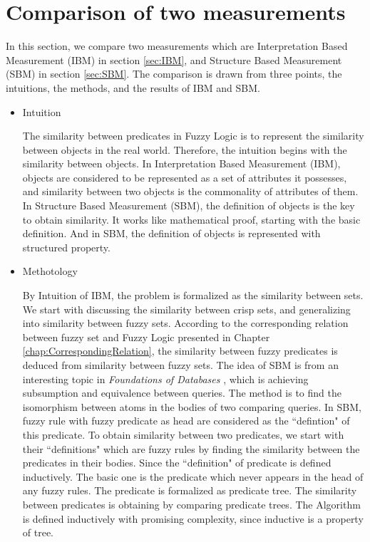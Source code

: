 \section{Comparison of two measurements}
\label{sec:CompTwoMeasurements}
In this section, we compare two measurements which are Interpretation Based Measurement (IBM) in section \ref{sec:IBM}, and  Structure Based Measurement (SBM) in section \ref{sec:SBM}. The comparison is drawn from three points, the intuitions, the methods, and the results of IBM and SBM.

\begin{itemize}
\item Intuition 

The similarity between predicates in Fuzzy Logic is to represent the similarity between objects in the real world. Therefore, the intuition begins with  the similarity between objects. In Interpretation Based Measurement (IBM), objects are considered to be represented as a set of attributes it possesses, and similarity between two objects is the commonality of attributes of them. In Structure Based Measurement (SBM), the definition of objects is the key to obtain similarity. It works like mathematical proof, starting with the basic definition. And in SBM, the definition of objects  is represented with structured property.

\item Methotology

By Intuition of IBM, the problem is formalized as the similarity between sets. We start with discussing the similarity between crisp sets, and generalizing into similarity between fuzzy sets. According to the corresponding relation between fuzzy set and Fuzzy Logic presented in Chapter \ref{chap:CorrespondingRelation}, the similarity between fuzzy predicates is deduced from similarity between fuzzy sets. The idea of SBM is from an interesting topic in \textit{Foundations of Databases} \cite{AHV95}, which is achieving subsumption and equivalence between queries. The method is to find the isomorphism between atoms in the bodies of two comparing queries. In SBM, fuzzy rule with fuzzy predicate as head are considered as the ``defintion" of this predicate. To obtain similarity between two predicates, we start with their ``definitions" which are fuzzy rules by finding the similarity between the predicates in their bodies. Since the ``definition" of predicate is defined inductively. The basic one is the predicate which never appears in the head of any fuzzy rules. The predicate is formalized as predicate tree. The similarity between predicates is obtaining by comparing predicate trees. The Algorithm is defined inductively with promising complexity, since inductive is a property of tree.


\end{itemize}

